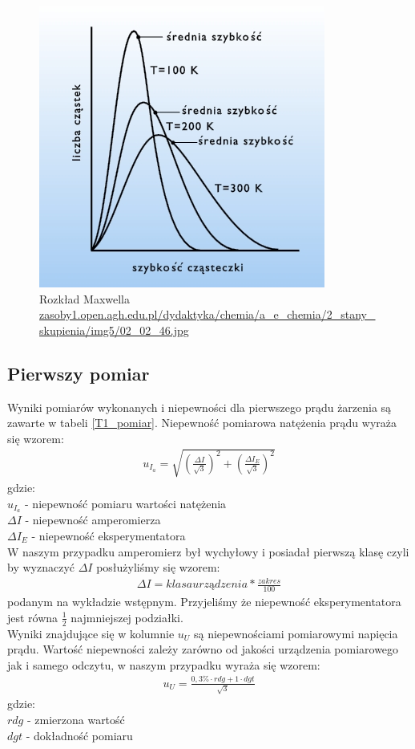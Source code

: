 \documentclass[a4paper]{article}
\newlength{\du}
\begin{document}
\begin{figure}
\centering
\includegraphics[scale=0.5]{rozlad_maxwella.jpg}
\caption{Rozkład Maxwella \url{zasoby1.open.agh.edu.pl/dydaktyka/chemia/a_e_chemia/2_stany_skupienia/img5/02_02_46.jpg}}
\end{figure}

\subsection{Pierwszy pomiar}
Wyniki pomiarów wykonanych i niepewności dla pierwszego prądu żarzenia są zawarte w tabeli \ref{T1_pomiar}. Niepewność pomiarowa natężenia prądu wyraża się wzorem: 
\begin{align*}
u_{I_{a}} = \sqrt{(\frac{\Delta I}{\sqrt{3}})^2 + (\frac{\Delta I_{E}}{\sqrt{3}})^2}
\end{align*}
gdzie:\\
$u_{I_{a}}$ - niepewność pomiaru wartości natężenia \\
$\Delta I$ - niepewność amperomierza \\
$\Delta I_{E}$ - niepewność eksperymentatora\\

W naszym przypadku amperomierz był wychyłowy i posiadał pierwszą klasę czyli by wyznaczyć $\Delta I$ posłużyliśmy się wzorem:
\begin{align*}
\Delta I = klasa urządzenia * \frac{zakres}{100}
\end{align*}
podanym na wykładzie wstępnym.
Przyjeliśmy że niepewność eksperymentatora jest równa $\frac{1}{2}$ najmniejszej podziałki.\\

Wyniki znajdujące się w kolumnie $u_{U}$ są niepewnościami pomiarowymi napięcia prądu. Wartość niepewności zależy zarówno od jakości urządzenia pomiarowego jak i samego odczytu, w naszym przypadku wyraża się wzorem:
\begin{align*}
u_{U} = \frac{0,3 \% \cdot rdg + 1 \cdot dgt}{\sqrt{3}}
\end{align*}
gdzie: \\
$rdg$ - zmierzona wartość \\
$dgt$ - dokładność pomiaru \\
\end{document}
